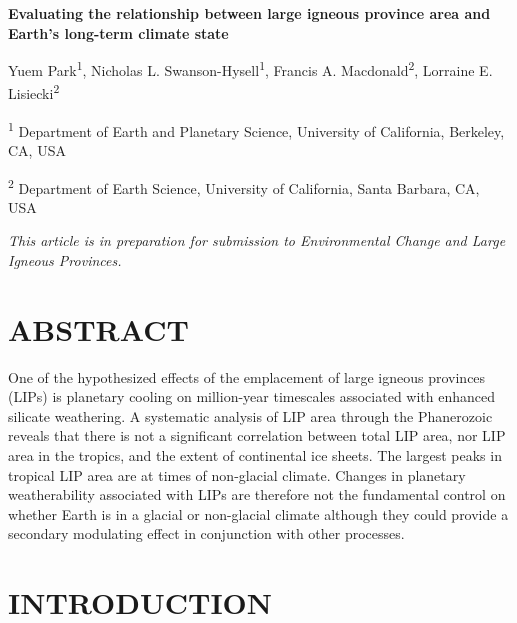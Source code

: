 \documentclass[11pt,letterpaper]{article}
\begin{document}
\begin{flushleft}
{\Large \textbf{Evaluating the relationship between large igneous province area and Earth's long-term climate state}}

Yuem Park\textsuperscript{1},
Nicholas L. Swanson-Hysell\textsuperscript{1},
Francis A. Macdonald\textsuperscript{2},
Lorraine E. Lisiecki\textsuperscript{2}

\bigskip
\textsuperscript{1} Department of Earth and Planetary Science, University of California, Berkeley, CA, USA

\textsuperscript{2} Department of Earth Science, University of California, Santa Barbara, CA, USA
\bigskip

\end{flushleft}

\noindent\textit{This article is in preparation for submission to \textit{Environmental Change and Large Igneous Provinces}.}

\linenumbers

\section*{ABSTRACT \label{sec:ABSTRACT}}

One of the hypothesized effects of the emplacement of large igneous provinces (LIPs) is planetary cooling on million-year timescales associated with enhanced silicate weathering. A systematic analysis of LIP area through the Phanerozoic reveals that there is not a significant correlation between total LIP area, nor LIP area in the tropics, and the extent of continental ice sheets. The largest peaks in tropical LIP area are at times of non-glacial climate. Changes in planetary weatherability associated with LIPs are therefore not the fundamental control on whether Earth is in a glacial or non-glacial climate although they could provide a secondary modulating effect in conjunction with other processes.

\section*{INTRODUCTION \label{sec:INTRODUCTION}}
\end{document}
